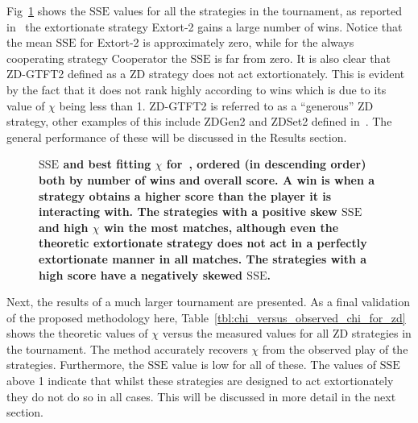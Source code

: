 \documentclass[10pt,letterpaper]{article}
\newcommand{\SSe}{\text{SSE}}
\begin{document}
Fig~\ref{fig:sserror_in_stewart_plotkin} shows the
\(\SSe\) values for all the strategies in the tournament, as
reported in~\cite{Stewart2012} the extortionate strategy Extort-2 gains a large number of
wins. Notice that the mean \(\SSe\) for Extort-2 is approximately zero, while for
the always cooperating strategy Cooperator the \(\SSe\) is far from zero. It is
also clear that ZD-GTFT2 defined as a ZD strategy does not act
extortionately. This is evident by the fact that it does not rank highly according
to wins which is due to its value of \(\chi\) being less than 1.
ZD-GTFT2 is referred to as a ``generous'' ZD strategy, other examples of this
include ZDGen2 and ZDSet2 defined in~\cite{sep-prisoner-dilemma}. The
general performance of these will be discussed in
the Results section.

\begin{figure}[!htbp]
    \centering
    \caption{{\bf\(\SSe\) and best fitting \(\chi\) for~\cite{Stewart2012},
        ordered (in descending order) both by number of wins and overall score.
        A win is when a strategy obtains a higher score than the player it is
        interacting with.
        The strategies with a positive skew
        \(\SSe\) and high \(\chi\) win the most matches, although even the
        theoretic
        extortionate strategy does not act in a perfectly extortionate manner in
        all matches. The strategies with a high score have a negatively skewed
        \(\SSe\).
        }}
    \label{fig:sserror_in_stewart_plotkin}
\end{figure}

Next, the results of a much larger tournament are presented.
As a final validation of the proposed methodology here,
Table~\ref{tbl:chi_versus_observed_chi_for_zd} shows the theoretic values of
\(\chi\) versus the measured values for all ZD strategies in the tournament.
The method accurately recovers \(\chi\) from the observed play of
the strategies. Furthermore, the \(\SSe\) value is low for all of these. The
values of \(\SSe\) above 1 indicate that whilst these strategies are designed to
act extortionately they do not do so in all cases. This will be discussed in
more detail in the next section.
\end{document}

